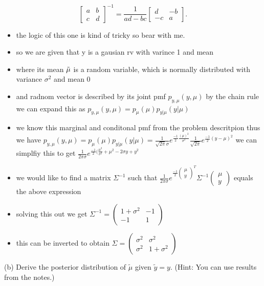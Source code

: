 \documentclass[10pt]{article}
\begin{document}
$$
\left[\begin{array}{ll}
a & b \\
c & d
\end{array}\right]^{-1}=\frac{1}{a d-b c}\left[\begin{array}{cc}
d & -b \\
-c & a
\end{array}\right] .
$$
\begin{itemize}
    \item  the logic of this one is kind of tricky so bear with me. 
    \item so we are given that y is a gausian rv with varince 1 and mean  
    \item where its mean $\Tilde{\mu}$ is a random variable, which is normally distributed with variance $\sigma^2$ and mean 0 
    \item and radnom vector is described by its joint pmf $p_{y,\mu}(y,\mu)$ by the chain rule we can expand this as $p_{y,\mu}(y,\mu)=p_{\mu}(\mu)p_{y|\mu}(y|\mu)$
    \item we know this marginal and conditonal pmf from the problem descritpion thus we have $p_{y,\mu}(y,\mu)=p_{\mu}(\mu)p_{y|\mu}(y|\mu)=\frac{1}{\sqrt{2\pi}\sigma}e^{\frac{-1}{2}\frac{(\mu)^2}{\sigma^2}}\frac{1}{\sqrt{2\pi}}e^{\frac{-1}{2}(y-\mu)^2}$ we can simplfiy this to get $\frac{1}{2\pi\sigma}e^{\frac{-1}{2}(\frac{\mu^2}{\sigma^2}+\mu^2-2\sigma y+y^2}$
    \item we would like to find a matrix $\Sigma^{-1}$ such that $\frac{1}{2\pi\sigma}e^{\frac{-1}{2}
    \begin{pmatrix}\mu \\ y\end{pmatrix}^{T} }\Sigma^{-1}\begin{pmatrix}\mu \\ y\end{pmatrix}$ equals the above expression 
    \item solving this out we get $\Sigma^{-1}=\begin{pmatrix}
        1+\sigma^2&-1\\-1&1
    \end{pmatrix}$
    \item this can be inverted to obtain $\Sigma=\begin{pmatrix}
        \sigma^2 & \sigma^2\\\sigma^2&1+\sigma^2
    \end{pmatrix}$
\end{itemize}
(b) Derive the posterior distribution of $\tilde{\mu}$ given $\tilde{y}=y$. (Hint: You can use results from the notes.)
\end{document}

